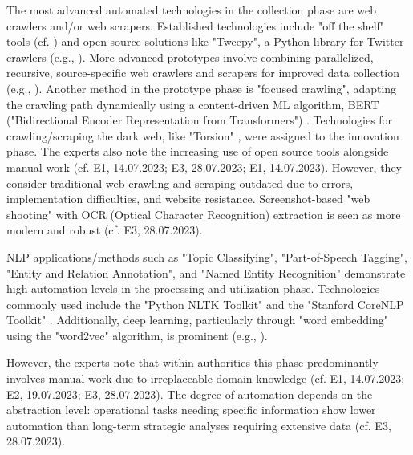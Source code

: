 \documentclass[10pt]{article}
\begin{document}
The most advanced automated technologies in the collection phase are web crawlers and/or web scrapers.
Established technologies include "off the shelf" tools (cf. \cite{Middleton.2020}) and open source
solutions like "Tweepy", a Python library for Twitter crawlers (e.g., \cite{Adewopo.2020}).
More advanced prototypes involve combining parallelized, recursive, source-specific web crawlers and scrapers for improved
data collection (e.g., \cite{Jenkins.2021}). Another method in the prototype phase is
"focused crawling", adapting the crawling path dynamically using a content-driven ML algorithm, BERT ("Bidirectional Encoder Representation from Transformers")
\cite{Kuehn.2023}. Technologies for crawling/scraping the dark web, like "Torsion" \cite{Sonawane.2022},
were assigned to the innovation phase. The experts also note the increasing use of open source tools alongside manual work
(cf. E1, 14.07.2023; E3, 28.07.2023; E1, 14.07.2023). However, they consider traditional web crawling and scraping
outdated due to errors, implementation difficulties, and website resistance. Screenshot-based "web shooting" with
OCR (Optical Character Recognition) extraction is seen as more modern and robust (cf. E3, 28.07.2023).

NLP applications/methods such as "Topic Classifying", "Part-of-Speech Tagging", "Entity and Relation Annotation", and "Named Entity Recognition"
demonstrate high automation levels in the processing and utilization phase. Technologies commonly used include
the "Python NLTK Toolkit" \cite{Hubbard.2022} and the "Stanford CoreNLP Toolkit" \cite{Middleton.2020}.
Additionally, deep learning, particularly through "word embedding" using the "word2vec" algorithm, is prominent
(e.g., \cite{Bai.2020}).


However, the experts note that within authorities this phase predominantly involves manual work due to irreplaceable domain knowledge
(cf. E1, 14.07.2023; E2, 19.07.2023; E3, 28.07.2023). The degree of automation depends on the abstraction level:
operational tasks needing specific information show lower automation than long-term strategic analyses requiring
extensive data (cf. E3, 28.07.2023).
\end{document}
